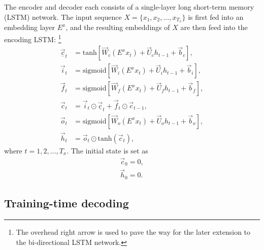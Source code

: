 \documentclass[11pt,a4paper]{article}
\begin{document}
The encoder and decoder each consists of a single-layer long short-term memory (LSTM) network. The input sequence $X = \{x_1, x_2, \dots, x_{T_x}\}$ is first fed into an embedding layer $E^x$, and the resulting embeddings of $X$ are then feed into the encoding LSTM:%
\footnote{The overhead right arrow is used to pave the way for the later extension to the bi-directional LSTM network.}
\begin{align}
	\overrightarrow{\underline{c}}_t &= \textrm{tanh}\left[ \overrightarrow{W}_c (E^x x_t) + \overrightarrow{U}_c h_{t-1} + \overrightarrow{b}_c \right], \\
	\overrightarrow{i}_t &= \textrm{sigmoid}\left[ \overrightarrow{W}_i (E^x x_t) + \overrightarrow{U}_i h_{t-1} + \overrightarrow{b}_i \right], \\
	\overrightarrow{f}_t &= \textrm{sigmoid}\left[ \overrightarrow{W}_f (E^x x_t) + \overrightarrow{U}_f h_{t-1} + \overrightarrow{b}_f \right], \\
	\overrightarrow{c}_t &= \overrightarrow{i}_t \odot \overrightarrow{\underline{c}}_t + \overrightarrow{f}_t \odot \overrightarrow{c}_{t-1}, \\
	\overrightarrow{o}_t &= \textrm{sigmoid}\left[ \overrightarrow{W}_o (E^x x_t) + \overrightarrow{U}_o h_{t-1} + \overrightarrow{b}_o \right], \\
	\overrightarrow{h}_t &= \overrightarrow{o}_t \odot \textrm{tanh}(\overrightarrow{c}_t),
\end{align}
where $t = 1, 2, \dots, T_x$. The initial state is set as
\begin{align}
	\overrightarrow{c}_0 = 0, \\
	\overrightarrow{h}_0 = 0.
\end{align}



\subsection{Training-time decoding}
\end{document}
